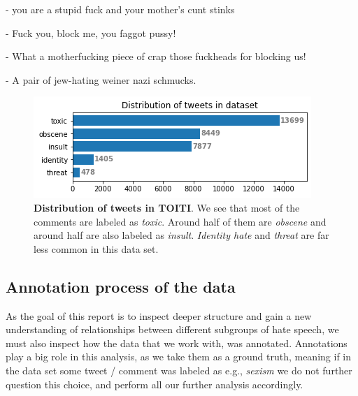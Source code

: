 \documentclass[fleqn,moreauthors,10pt]{ds_report}
\newcommand\bm{0.2pt}
\begin{document}
\begin{tcolorbox}[width=0.9\linewidth, center,arc=8pt,sharp corners=downhill, boxrule=0.3pt, left=\bm, top=\bm, right=\bm, bottom=\bm, fontupper=\small]
 - you are a stupid fuck and your mother's cunt stinks
\end{tcolorbox}

\begin{tcolorbox}[width=0.9\linewidth, center,arc=8pt,sharp corners=downhill, boxrule=0.3pt, left=\bm, top=\bm, right=\bm, bottom=\bm, fontupper=\small]
 - Fuck you, block me, you faggot pussy!
\end{tcolorbox}

\begin{tcolorbox}[width=0.9\linewidth, center,arc=8pt,sharp corners=downhill, boxrule=0.3pt, left=\bm, top=\bm, right=\bm, bottom=\bm, fontupper=\small]
 - What a motherfucking piece of crap those fuckheads for blocking us!
\end{tcolorbox}

\begin{tcolorbox}[width=0.9\linewidth, center,arc=8pt,sharp corners=downhill, boxrule=0.3pt, left=\bm, top=\bm, right=\bm, bottom=\bm, fontupper=\small]
 - A pair of jew-hating weiner nazi schmucks.
\end{tcolorbox}


\begin{figure}
	\includegraphics[width=\linewidth]{distribution_wiki_dataset.png}
	\caption{\textbf{Distribution of tweets in TOITI}. We see that most of the comments are labeled as \textit{toxic}. Around half of them are \textit{obscene} and around half are also labeled as \textit{insult}. \textit{Identity hate} and \textit{threat} are far less common in this data set.}
	\label{fig:distribution_wiki_dataset}
\end{figure}


\subsection{Annotation process of the data}
As the goal of this report is to inspect deeper structure and gain a new understanding of relationships between different subgroups of hate speech, we must also inspect how the data that we work with, was annotated. Annotations play a big role in this analysis, as we take them as a ground truth, meaning if in the data set some tweet / comment was labeled as e.g., \textit{sexism} we do not further question this choice, and perform all our further analysis accordingly.
\end{document}
